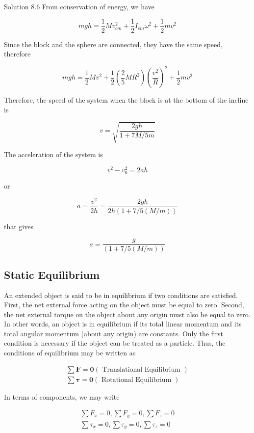 \documentclass[10pt]{article}
\numberwithin{equation}{section}
\begin{document}
Solution 8.6 From conservation of energy, we have

$$
m g h=\frac{1}{2} M v_{c m}^{2}+\frac{1}{2} I_{c m} \omega^{2}+\frac{1}{2} m v^{2}
$$

Since the block and the sphere are connected, they have the same speed, therefore

$$
m g h=\frac{1}{2} M v^{2}+\frac{1}{2}\left(\frac{2}{5} M R^{2}\right)\left(\frac{v^{2}}{R}\right)^{2}+\frac{1}{2} m v^{2}
$$

Therefore, the speed of the system when the block is at the bottom of the incline is

$$
v=\sqrt{\frac{2 g h}{1+7 M / 5 m}}
$$

The acceleration of the system is

$$
v^{2}-v_{0}^{2}=2 a h
$$

or

$$
a=\frac{v^{2}}{2 h}=\frac{2 g h}{2 h(1+7 / 5(M / m))}
$$

that gives

$$
a=\frac{g}{(1+7 / 5(M / m))}
$$

\subsection{Static Equilibrium}\label{sec:8-3}
An extended object is said to be in equilibrium if two conditions are satisfied. First, the net external force acting on the object must be equal to zero. Second, the net external torque on the object about any origin must also be equal to zero. In other words, an object is in equilibrium if its total linear momentum and its total angular momentum (about any origin) are constants. Only the first condition is necessary if the object can be treated as a particle. Thus, the conditions of equilibrium may be written as


\begin{gather}
\sum \mathbf{F}=\mathbf{0}(\text { Translational Equilibrium })  \label{eq:8-7}\\
\sum \boldsymbol{\tau}=\mathbf{0}(\text { Rotational Equilibrium }) \label{eq:8-8}
\end{gather}


In terms of components, we may write


\begin{gather}
\sum F_{x}=0, \sum F_{y}=0, \sum F_{z}=0  \label{eq:8-9}\\
\sum \tau_{x}=0, \sum \tau_{y}=0, \sum \tau_{z}=0 \label{eq:8-10}
\end{gather}
\end{document}

